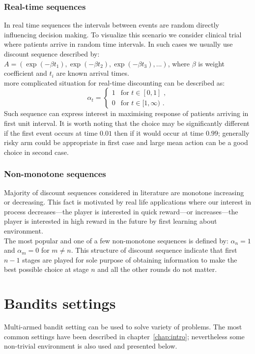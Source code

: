 \documentclass[12pt, a4paper, pdflatex, leqno]{report}
\begin{document}
\subsubsection{Real-time sequences}
In real time sequences the intervals between events are random directly influencing decision making. To visualize this scenario we consider clinical trial where patients arrive in random time intervals. In such cases we usually use discount sequence described by: $A = ( \exp(-\beta t_1), \exp(-\beta t_2), \exp(-\beta t_3),... )$, where $\beta$ is weight coefficient and $t_i$ are known arrival times.\\
more complicated situation for real-time discounting can be described as:
$$
  \alpha_t =
    \begin{cases}
      1 & \text{for } t \in [0,1] \text{ ,} \\
      0 & \text{for } t \in [1,\infty) \text{ .}
    \end{cases}
$$
Such sequence can express interest in maximising response of patients arriving in first unit interval. It is worth noting that the choice may be significantly different if the first event occurs at time $0.01$ then if it would occur at time $0.99$; generally risky arm could be appropriate in first case and large mean action can be a good choice in second case.\\

\subsubsection{Non-monotone sequences}
Majority of discount sequences considered in literature are monotone increasing or decreasing. This fact is motivated by real life applications where our interest in process decreases---the player is interested in  quick reward---or increases---the player is interested in high reward in the future by first learning about environment.\\
The most popular and one of a few non-monotone sequences is defined by: $\alpha_n = 1$ and $\alpha_m = 0$ for $m \neq n$. This structure of discount sequence indicate that first $n-1$ stages are played for sole purpose of obtaining information to make the best possible choice at stage $n$ and all the other rounds do not matter.\\


\section{Bandits settings}
Multi-armed bandit setting can be used to solve variety of problems. The most common settings have been described in chapter~\ref{chap:intro}; nevertheless some non-trivial environment is also used and presented below.\\
\end{document}
